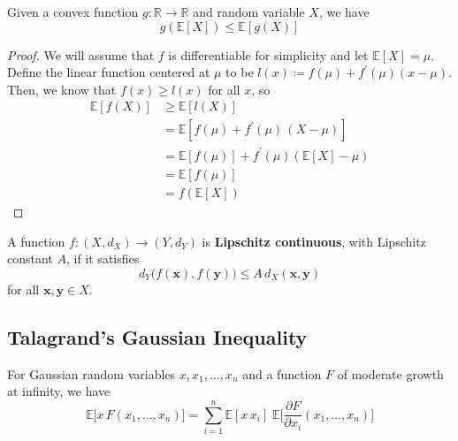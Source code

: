 \documentclass{article}
\begin{document}
\begin{lemma}
Given a convex function $g: \mathbb{R} \rightarrow \mathbb{R}$ and random variable $X$, we have 
\[g(\mathbb{E}[X]) \leq \mathbb{E}[g(X)]\]
\end{lemma}
\begin{proof}
We will assume that $f$ is differentiable for simplicity and let $\mathbb{E}[X] = \mu$. Define the linear function centered at $\mu$ to be $l(x) \coloneqq f(\mu) + f^\prime (\mu) (x - \mu)$. Then, we know that $f(x) \geq l(x)$ for all $x$, so 
\begin{align*}
    \mathbb{E}[f(X)] & \geq \mathbb{E}[ l(X)] \\ 
    & = \mathbb{E}[f(\mu) + f^\prime (\mu) \, (X - \mu)] \\
    & = \mathbb{E}[f(\mu)] + f^\prime (\mu) ( \mathbb{E}[X] - \mu) \\
    & = \mathbb{E}[f(\mu)] \\
    & = f(\mathbb{E}[X])
\end{align*}
\end{proof}

\begin{definition}
A function $f: (X, d_X) \longrightarrow (Y, d_Y)$ is \textbf{Lipschitz continuous}, with Lipschitz constant $A$, if it satisfies 
\[d_Y \big( f(\mathbf{x}), f(\mathbf{y})\big) \leq A \, d_X (\mathbf{x}, \mathbf{y})\]
for all $\mathbf{x}, \mathbf{y} \in X$. 
\end{definition}

\subsection{Talagrand's Gaussian Inequality}

\begin{lemma}
For Gaussian random variables $x, x_1, \ldots, x_n$ and a function $F$ of moderate growth at infinity, we have 
\[\mathbb{E}\big[ x \, F(x_1, \ldots, x_n) \big] = \sum_{i=1}^n \mathbb{E}[x \, x_i] \; \mathbb{E}\bigg[ \frac{\partial F}{\partial x_i} (x_1, \ldots, x_n) \bigg]\]
\end{lemma}
\end{document}
